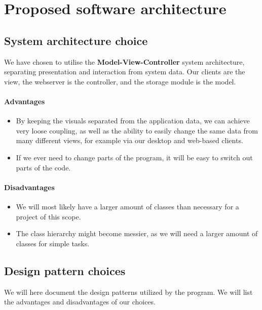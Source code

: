 \chapter{Proposed software architecture}
\label{sec:Proposed software architecture}






\section{System architecture choice}
We have chosen to utilise the \textbf{Model-View-Controller} system architecture, separating presentation and interaction from system data. Our clients are the view, the webserver is the controller, and the storage module is the model.

\subsubsection{Advantages}
\begin{itemize}
	\item By keeping the visuals separated from the application data, we can achieve very loose coupling, as well as the ability to easily change the same data from many different views, for example via our desktop and web-based clients. \\
	\item If we ever need to change parts of the program, it will be easy to switch out parts of the code.
\end{itemize}


\subsubsection{Disadvantages}
\begin{itemize}
	\item We will most likely have a larger amount of classes than necessary for a project of this scope. \\
	\item The class hierarchy might become messier, as we will need a larger amount of classes for simple tasks.
\end{itemize}

\section{Design pattern choices}
We will here document the design patterns utilized by the program. We will list the advantages and disadvantages of our choices.

